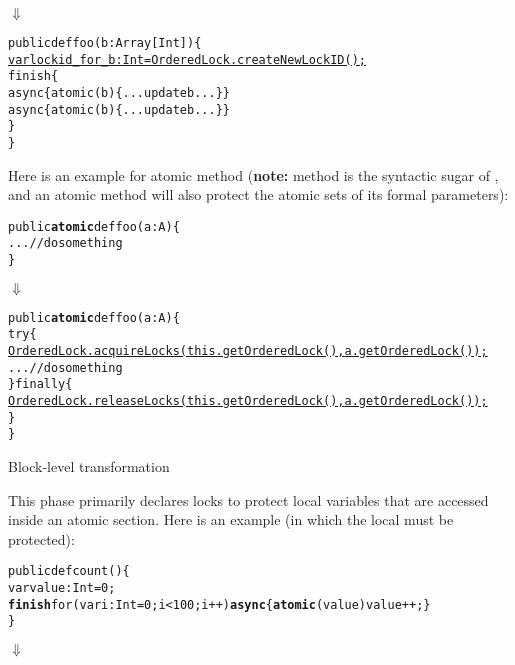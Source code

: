 \documentclass{article}
\begin{document}
\begin{enumerate}
\begin{itemize}
\hspace{10mm}$\Downarrow$

\begin{CodeOut}
\begin{alltt}
public def foo(b:Array[Int]) \{
    \underline{var lockid\_for\_b:Int = OrderedLock.createNewLockID();}
    finish \{
       async \{atomic(b) \{...update b... \}\}
       async \{atomic(b) \{...update b... \}\}
    \}
\}
\end{alltt}
\end{CodeOut}
\end{itemize}

Here is an example for atomic method (\textbf{note:}  method is the syntactic sugar of , and an atomic method will also protect the atomic sets of its formal parameters):

\begin{CodeOut}
\begin{alltt}
public \textbf{atomic} def foo(a:A) \{
    ...//do something
\}
\end{alltt}
\end{CodeOut}

\hspace{10mm}$\Downarrow$

\begin{CodeOut}
\begin{alltt}
public \textbf{atomic} def foo(a:A) \{
  try\{
    \underline{OrderedLock.acquireLocks(this.getOrderedLock(), a.getOrderedLock());}
    ...//do something
  \} finally \{
    \underline{OrderedLock.releaseLocks(this.getOrderedLock(), a.getOrderedLock());}
  \}
\}
\end{alltt}
\end{CodeOut}

\Item Block-level transformation

This phase primarily declares locks to protect local variables that are accessed inside an atomic section. Here is an example (in which the local  must be protected):

\begin{CodeOut}
\begin{alltt}
public def count() \{
    var value:Int = 0;
    \textbf{finish} for (var i:Int = 0; i < 100; i++) \textbf{async} \{ \textbf{atomic}(value) value ++; \}
\}
\end{alltt}
\end{CodeOut}

\hspace{10mm}$\Downarrow$


\end{enumerate}
\end{document}
